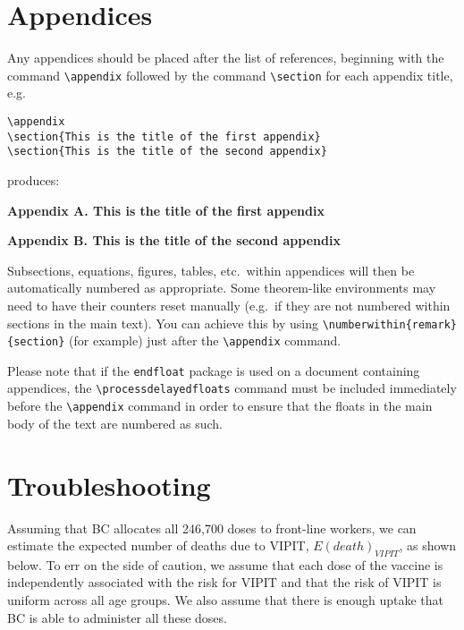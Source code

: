 \section{Appendices}

Any appendices should be placed after the list of references, beginning with the command \verb"\appendix" followed by the command \verb"\section" for each appendix title, e.g.
\begin{verbatim}
\appendix
\section{This is the title of the first appendix}
\section{This is the title of the second appendix}
\end{verbatim}
produces:\medskip

\noindent\textbf{Appendix A. This is the title of the first appendix}\medskip

\noindent\textbf{Appendix B. This is the title of the second appendix}\medskip

\noindent Subsections, equations, figures, tables, etc.\ within appendices will then be automatically numbered as appropriate. Some theorem-like environments may need to have their counters reset manually (e.g.\ if they are not numbered within sections in the main text). You can achieve this by using \verb"\numberwithin{remark}{section}" (for example) just after the \verb"\appendix" command.

Please note that if the \verb"endfloat" package is used on a document containing appendices, the \verb"\processdelayedfloats" command must be included immediately before the \verb"\appendix" command in order to ensure that the floats in the main body of the text are numbered as such.


\appendix

\section{Troubleshooting}

Assuming that BC allocates all 246,700 doses to front-line workers, we can estimate the expected number of deaths due to VIPIT, $E(death)_{VIPIT}$, as shown below. To err on the side of caution, we assume that each dose of the vaccine is independently associated with the risk for VIPIT and that the risk of VIPIT is uniform across all age groups. We also assume that there is enough uptake that BC is able to administer all these doses.

